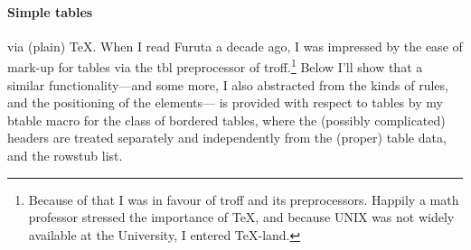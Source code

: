 \paragraph*{Simple tables}via (plain) \TeX.
When I read Furuta a decade ago, I was impressed by the ease of mark-up
for tables via the tbl preprocessor of troff.\footnote{Because of
   that I was in favour of troff and its preprocessors.
   Happily a math professor stressed the importance of \TeX, and because
   UNIX was not widely available at the University, I entered \TeX-land.}
Below I'll show that a similar functionality---and some more, I also
   abstracted from the kinds of rules, and the positioning of the elements---%
is provided with respect to tables
by my btable macro for the class of bordered tables,
where the (possibly complicated) headers are treated separately
and independently from the (proper) table data, and the rowstub list.

